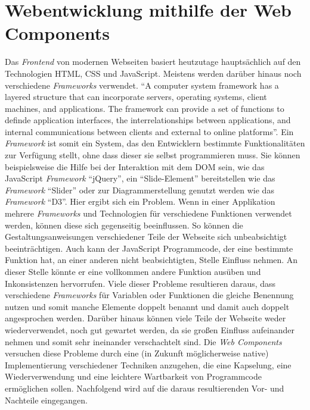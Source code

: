 \documentclass[12pt, paper=a4, bibtotoc, toc=listof, headsepline=true]{scrreprt}
\begin{document}
		\section{Webentwicklung mithilfe der Web Components}
		Das \emph{Frontend} von modernen Webseiten basiert heutzutage hauptsächlich auf den Technologien \ac{HTML}, \ac{CSS} und JavaScript. Meistens werden darüber hinaus noch verschiedene \emph{Frameworks} verwendet. \enquote{A computer system framework has a layered structure that can incorporate servers, operating systems, client machines, and applications. The framework can provide a set of functions to definde application interfaces, the interrelationships between applications, and internal communications between clients and external to online platforms}\cite[S.15]{stuart2013roadmap}. Ein \emph{Framework} ist somit ein System, das den Entwicklern bestimmte Funktionalitäten zur Verfügung stellt, ohne dass dieser sie selbst programmieren muss. Sie können beispielsweise die Hilfe bei der Interaktion mit dem \ac{DOM} sein, wie das JavaScript \emph{Framework} \enquote{jQuery}, ein \enquote{Slide-Element} bereitstellen wie das \emph{Framework} \enquote{Slider} oder zur Diagrammerstellung genutzt werden wie das \emph{Framework} \enquote{D3}. Hier ergibt sich ein Problem. Wenn in einer Applikation mehrere \emph{Frameworks} und Technologien für verschiedene Funktionen verwendet werden, können diese sich gegenseitig beeinflussen. So können die Gestaltungsanweisungen verschiedener Teile der Webseite sich unbeabsichtigt beeinträchtigen. Auch kann der  JavaScript Programmcode, der eine bestimmte Funktion hat, an einer anderen nicht beabsichtigten, Stelle Einfluss nehmen. An dieser Stelle könnte er eine vollkommen andere Funktion ausüben und Inkonsistenzen hervorrufen. Viele dieser Probleme resultieren daraus, dass verschiedene \emph{Frameworks} für Variablen oder Funktionen die gleiche Benennung nutzen und somit manche Elemente doppelt benannt und damit auch doppelt angesprochen werden. Darüber hinaus können viele Teile der Webseite weder wiederverwendet, noch gut gewartet werden, da sie großen Einfluss aufeinander nehmen und somit sehr ineinander verschachtelt sind.
		Die \emph{Web Components} versuchen diese Probleme durch eine (in Zukunft möglicherweise native) Implementierung verschiedener Techniken anzugehen, die eine Kapselung, eine Wiederverwendung und eine leichtere Wartbarkeit von Programmcode ermöglichen sollen. Nachfolgend wird auf die daraus resultierenden Vor- und Nachteile eingegangen. 			
\end{document}
